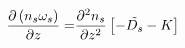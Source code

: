 \begin{equation}
\begin{split}
\frac{\partial\left(n_s\omega_s\right)}{\partial z} = & \frac{\partial^2n_s}{\partial{z}^2}\left[-\tilde{D_s} - K\right]
\end{split}
\end{equation}
